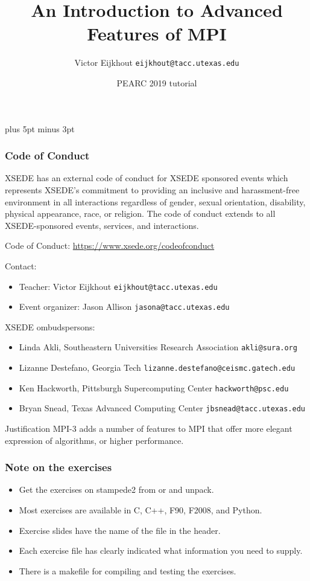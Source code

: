 \documentclass[11pt,headernav]{beamer}
\def\Location{}%
\def\Location{PEARC 2019 tutorial}
\begin{document}
\parskip=10pt plus 5pt minus 3pt

\title{An Introduction to Advanced Features of MPI}
\author{Victor Eijkhout {\tt eijkhout@tacc.utexas.edu}}
\date{\Location}

\begin{frame}
  \titlepage
\end{frame}

\begin{frame}\frametitle{Code of Conduct}
  \scriptsize
  XSEDE has an external code of conduct for XSEDE sponsored events
  which represents XSEDE's commitment to providing an inclusive and
  harassment-free environment in all interactions regardless of
  gender, sexual orientation, disability, physical appearance, race,
  or religion. The code of conduct extends to all XSEDE-sponsored
  events, services, and interactions.

  Code of Conduct: \url{https://www.xsede.org/codeofconduct}

  Contact:
  \begin{itemize}
  \item Teacher: Victor Eijkhout \texttt{eijkhout@tacc.utexas.edu}\\
  \item  Event organizer: Jason Allison  \texttt{jasona@tacc.utexas.edu}
  \end{itemize}
  XSEDE ombudspersons:
  \begin{itemize}
  \item
    Linda Akli, Southeastern Universities Research Association
    \texttt{akli@sura.org}
  \item 
    Lizanne Destefano, Georgia Tech
    \texttt{lizanne.destefano@ceismc.gatech.edu}
  \item 
    Ken Hackworth, Pittsburgh Supercomputing Center \texttt{hackworth@psc.edu}
  \item 
    Bryan Snead, Texas Advanced Computing Center
    \texttt{jbsnead@tacc.utexas.edu}
  \end{itemize}
\end{frame}

\begin{frame}{Justification}
  MPI-3 adds a number of features to MPI that offer more elegant
  expression of algorithms, or higher performance.
\end{frame}

\begin{frame}[containsverbatim]\frametitle{Note on the exercises}
  \begin{itemize}
  \item Get the exercises on stampede2 from
     or  and unpack.
  \item Most exercises are available in C, C++, F90, F2008, and Python.
  \item Exercise slides have the name of the file in the header.
  \item Each exercise file has clearly indicated what information you
    need to supply.
  \item There is a makefile for compiling and testing the exercises.
  \end{itemize}
\end{frame}
\end{document}
